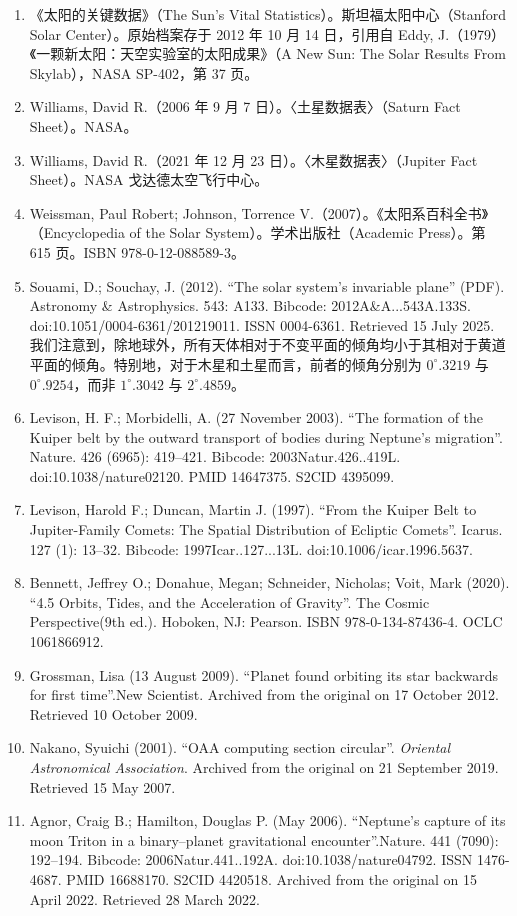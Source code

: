 \begin{enumerate}
\item 《太阳的关键数据》（The Sun's Vital Statistics）。斯坦福太阳中心（Stanford Solar Center）。原始档案存于 2012 年 10 月 14 日，引用自 Eddy, J.（1979）《一颗新太阳：天空实验室的太阳成果》（A New Sun: The Solar Results From Skylab），NASA SP-402，第 37 页。
\item Williams, David R.（2006 年 9 月 7 日）。〈土星数据表〉（Saturn Fact Sheet）。NASA。
\item Williams, David R.（2021 年 12 月 23 日）。〈木星数据表〉（Jupiter Fact Sheet）。NASA 戈达德太空飞行中心。
\item Weissman, Paul Robert; Johnson, Torrence V.（2007）。《太阳系百科全书》（Encyclopedia of the Solar System）。学术出版社（Academic Press）。第 615 页。ISBN 978-0-12-088589-3。
\item Souami, D.; Souchay, J. (2012). ``The solar system's invariable plane'' (PDF). Astronomy \& Astrophysics. 543: A133. Bibcode: 2012A\&A...543A.133S. doi:10.1051/0004-6361/201219011. ISSN 0004-6361. Retrieved 15 July 2025.  
我们注意到，除地球外，所有天体相对于不变平面的倾角均小于其相对于黄道平面的倾角。特别地，对于木星和土星而言，前者的倾角分别为 $0^\circ.3219$ 与 $0^\circ.9254$，而非 $1^\circ.3042$ 与 $2^\circ.4859$。
\item Levison, H. F.; Morbidelli, A. (27 November 2003). ``The formation of the Kuiper belt by the outward transport of bodies during Neptune's migration''. Nature. 426 (6965): 419–421. Bibcode: 2003Natur.426..419L. doi:10.1038/nature02120. PMID 14647375. S2CID 4395099.
\item Levison, Harold F.; Duncan, Martin J. (1997). ``From the Kuiper Belt to Jupiter-Family Comets: The Spatial Distribution of Ecliptic Comets''. Icarus. 127 (1): 13–32. Bibcode: 1997Icar..127...13L. doi:10.1006/icar.1996.5637.
\item Bennett, Jeffrey O.; Donahue, Megan; Schneider, Nicholas; Voit, Mark (2020). ``4.5 Orbits, Tides, and the Acceleration of Gravity''. The Cosmic Perspective(9th ed.). Hoboken, NJ: Pearson. ISBN 978-0-134-87436-4. OCLC 1061866912.
\item Grossman, Lisa (13 August 2009). ``Planet found orbiting its star backwards for first time''.New Scientist. Archived from the original on 17 October 2012. Retrieved 10 October 2009.
\item Nakano, Syuichi (2001). ``OAA computing section circular''. \textit{Oriental Astronomical Association}. Archived from the original on 21 September 2019. Retrieved 15 May 2007.
\item Agnor, Craig B.; Hamilton, Douglas P. (May 2006). ``Neptune's capture of its moon Triton in a binary–planet gravitational encounter''.Nature. 441 (7090): 192–194. Bibcode: 2006Natur.441..192A. doi:10.1038/nature04792. ISSN 1476-4687. PMID 16688170. S2CID 4420518. Archived from the original on 15 April 2022. Retrieved 28 March 2022.

\end{enumerate}
